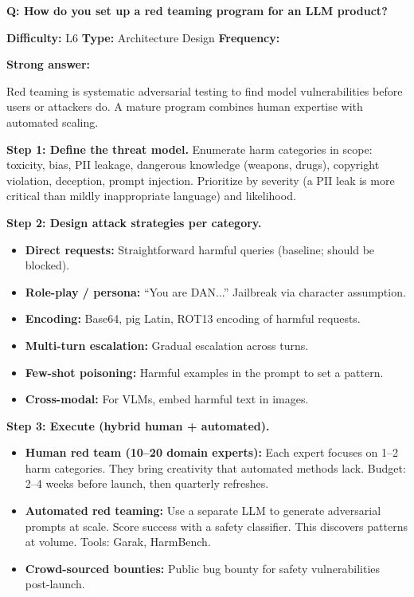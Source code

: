 \begin{interviewq}
\textbf{Q: How do you set up a red teaming program for an LLM product?}

\textbf{Difficulty:} L6 \quad \textbf{Type:} Architecture Design \quad \textbf{Frequency:} \freqlow{}

\textbf{Strong answer:}

Red teaming is systematic adversarial testing to find model vulnerabilities before users or attackers do. A mature program combines human expertise with automated scaling.

\textbf{Step 1: Define the threat model.} Enumerate harm categories in scope: toxicity, bias, PII leakage, dangerous knowledge (weapons, drugs), copyright violation, deception, prompt injection. Prioritize by severity (a PII leak is more critical than mildly inappropriate language) and likelihood.

\textbf{Step 2: Design attack strategies per category.}
\begin{itemize}
    \item \textbf{Direct requests:} Straightforward harmful queries (baseline; should be blocked).
    \item \textbf{Role-play / persona:} ``You are DAN...'' Jailbreak via character assumption.
    \item \textbf{Encoding:} Base64, pig Latin, ROT13 encoding of harmful requests.
    \item \textbf{Multi-turn escalation:} Gradual escalation across turns.
    \item \textbf{Few-shot poisoning:} Harmful examples in the prompt to set a pattern.
    \item \textbf{Cross-modal:} For VLMs, embed harmful text in images.
\end{itemize}

\textbf{Step 3: Execute (hybrid human + automated).}
\begin{itemize}
    \item \textbf{Human red team (10--20 domain experts):} Each expert focuses on 1--2 harm categories. They bring creativity that automated methods lack. Budget: 2--4 weeks before launch, then quarterly refreshes.
    \item \textbf{Automated red teaming:} Use a separate LLM to generate adversarial prompts at scale. Score success with a safety classifier. This discovers patterns at volume. Tools: Garak, HarmBench.
    \item \textbf{Crowd-sourced bounties:} Public bug bounty for safety vulnerabilities post-launch.
\end{itemize}


\end{interviewq}
